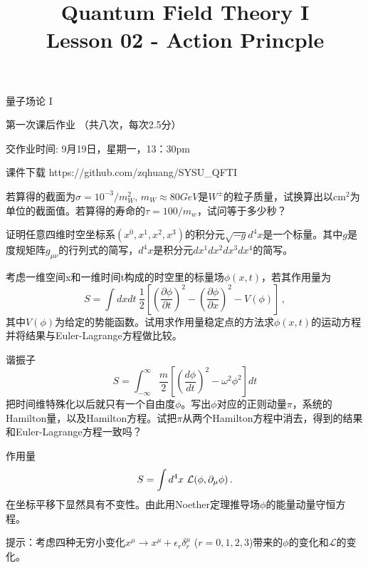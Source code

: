 \documentclass[CJK]{beamer}
\title{Quantum Field Theory I \\ Lesson 02 - Action Princple}
\author{}
\date{}
\begin{document}
\begin{frame}
 
\begin{center}
\begin{Large}
\bch
量子场论 I 

{\vskip 0.3in}

第一次课后作业 （共八次，每次2.5分）

交作业时间: 9月19日，星期一，13：30pm

\ech
\end{Large}
\end{center}

\vskip 0.2in

\bch
课件下载
\ech
https://github.com/zqhuang/SYSU\_QFTI

\end{frame}

\begin{frame}
\bch
若算得的截面为$\sigma = 10^{-3}/m_W^2$, $m_W \approx 80 GeV$是$W^{\pm}$的粒子质量，试换算出以$\mathrm{cm}^2$为单位的截面值。若算得的寿命的$\tau = 100/m_w$，试问等于多少秒？
\ech
\end{frame}



\begin{frame}
\bch
证明任意四维时空坐标系$(x^0, x^1, x^2, x^3)$的积分元$\sqrt{-g}d^4x$是一个标量。其中$g$是度规矩阵$g_{\mu\nu}$的行列式的简写，$d^4x$是积分元$dx^1dx^2dx^3dx^4$的简写。
\ech
\end{frame}


\begin{frame}
\bch
考虑一维空间x和一维时间t构成的时空里的标量场$\phi(x,t)$，若其作用量为
$$ S = \int dx dt \   \frac{1}{2} \left[\left(\frac{\partial \phi}{\partial t}\right)^2 - \left(\frac{\partial \phi}{\partial x}\right)^2 - V(\phi)\right]\, ,$$
其中$V(\phi)$为给定的势能函数。试用求作用量稳定点的方法求$\phi(x, t)$的运动方程并将结果与Euler-Lagrange方程做比较。
\ech
\end{frame}

\begin{frame}
\bch
谐振子
$$ S = \int_{-\infty}^\infty \frac{m}{2}\left[(\frac{d\phi}{dt})^2 - \omega^2\phi^2\right] dt$$
把时间维特殊化以后就只有一个自由度$\phi$。写出$\phi$对应的正则动量$\pi$，系统的Hamilton量，以及Hamilton方程。试把$\pi$从两个Hamilton方程中消去，得到的结果和Euler-Lagrange方程一致吗？
\ech
\end{frame}


\begin{frame}
作用量
$$S = \int d^4x\ \mathcal{L}(\phi, \partial_\mu\phi)\,.$$
在坐标平移下显然具有不变性。由此用Noether定理推导场$\phi$的能量动量守恒方程。

\skipline

提示：考虑四种无穷小变化$x^\mu \rightarrow x^\mu + \epsilon_r \delta_r^\mu$ ($r = 0, 1, 2, 3$)带来的$\phi$的变化和$\mathcal{L}$的变化。

\end{frame}
\end{document}
